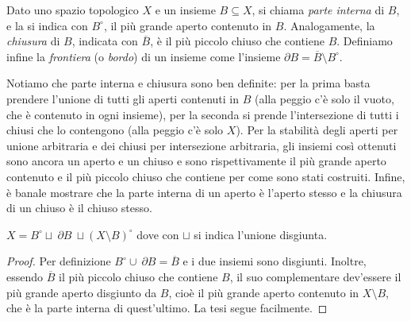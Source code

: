 \begin{defn}
	Dato uno spazio topologico $X$ e un insieme $B \subseteq X$, si chiama
	\textit{parte interna} di $B$, e la si indica con $B^{\circ}$, il più grande
	aperto contenuto in $B$. Analogamente, la \textit{chiusura} di $B$, indicata
	con $\overline{B}$, è il più piccolo chiuso che contiene $B$. Definiamo
	infine la \textit{frontiera} (o \textit{bordo}) di un insieme come l'insieme
	$\partial B= \overline{B} \setminus B^{\circ}$.
\end{defn}

Notiamo che parte interna e chiusura sono ben definite: per la prima basta
prendere l'unione di tutti gli aperti contenuti in $B$ (alla peggio c'è solo il
vuoto, che è contenuto in ogni insieme), per la seconda si prende l'intersezione
di tutti i chiusi che lo contengono (alla peggio c'è solo $X$). Per la stabilità
degli aperti per unione arbitraria e dei chiusi per intersezione arbitraria, gli
insiemi così ottenuti sono ancora un aperto e un chiuso e sono rispettivamente
il più grande aperto contenuto e il più piccolo chiuso che contiene per come
sono stati costruiti. Infine, è banale mostrare che la parte interna di un
aperto è l'aperto stesso e la chiusura di un chiuso è il chiuso stesso.

\begin{ftt}
	$X= B^{\circ} \sqcup\ \partial B\ \sqcup (X
	\setminus B)^{\circ}$ dove con $\sqcup$ si indica l'unione disgiunta.
\end{ftt}

\begin{proof}
	Per definizione $B^{\circ} \cup\ \partial B=\overline{B}$ e i due insiemi
	sono disgiunti. Inoltre, essendo $\overline B$ il più piccolo chiuso che
	contiene $B$, il suo complementare dev'essere il più grande aperto disgiunto
	da $B$, cioè il più grande aperto contenuto in $X \setminus B$, che è la
	parte interna di quest'ultimo. La tesi segue facilmente.
\end{proof}

